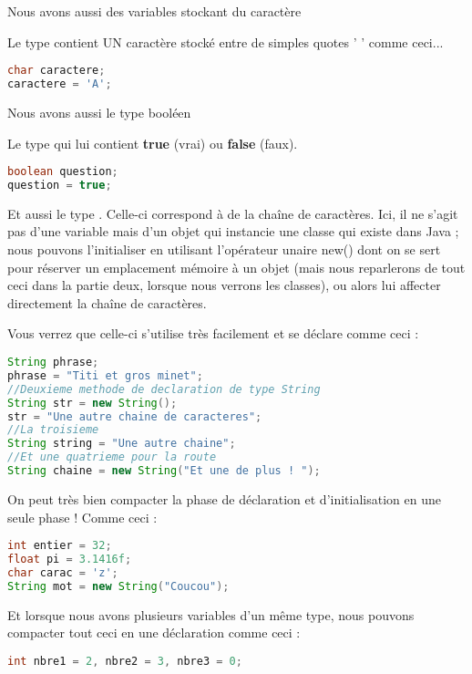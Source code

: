 \documentclass[a4paper,twoside]{article}
\begin{document}
Nous avons aussi des variables stockant du caractère

Le type  contient UN caractère stocké entre de simples quotes ' ' comme ceci...
\begin{lstlisting}[language=java]
char caractere;
caractere = 'A';
\end{lstlisting}

\bigskip

Nous avons aussi le type booléen

Le type  qui lui contient \textbf{true} (vrai) ou \textbf{false} (faux).
\begin{lstlisting}[language=java]
boolean question;
question = true;
\end{lstlisting}

Et aussi le type . Celle-ci correspond à de la chaîne de caractères.
Ici, il ne s'agit pas d'une variable mais d'un objet qui instancie une classe qui existe dans Java ; nous pouvons l'initialiser en utilisant l'opérateur unaire new() dont on se sert pour réserver un emplacement mémoire à un objet (mais nous reparlerons de tout ceci dans la partie deux, lorsque nous verrons les classes), ou alors lui affecter directement la chaîne de caractères.

Vous verrez que celle-ci s'utilise très facilement et se déclare comme ceci :
\begin{lstlisting}[language=java]
String phrase;
phrase = "Titi et gros minet";
//Deuxieme methode de declaration de type String
String str = new String();
str = "Une autre chaine de caracteres";
//La troisieme
String string = "Une autre chaine";
//Et une quatrieme pour la route
String chaine = new String("Et une de plus ! ");
\end{lstlisting}

\bigskip

On peut très bien compacter la phase de déclaration et d'initialisation en une seule phase ! Comme ceci :
\begin{lstlisting}[language=java]
int entier = 32;
float pi = 3.1416f;
char carac = 'z';
String mot = new String("Coucou");
\end{lstlisting}

Et lorsque nous avons plusieurs variables d'un même type, nous pouvons compacter tout ceci en une déclaration comme ceci :
\begin{lstlisting}[language=java]
int nbre1 = 2, nbre2 = 3, nbre3 = 0;
\end{lstlisting}
\end{document}
